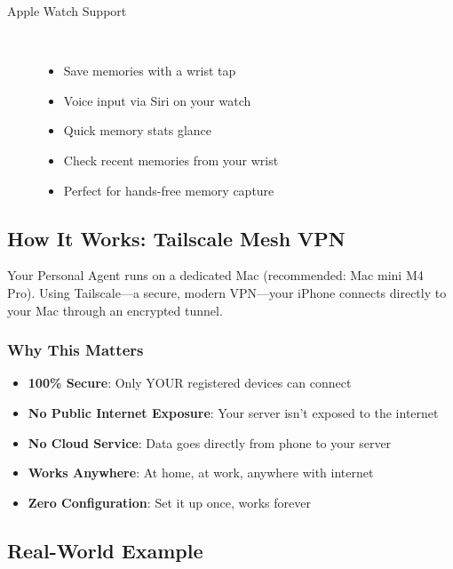\documentclass[11pt,letterpaper]{article}
\begin{document}
\begin{description}
    \item[Apple Watch Support] ~\\
        \begin{itemize}[leftmargin=*]
            \item Save memories with a wrist tap
            \item Voice input via Siri on your watch
            \item Quick memory stats glance
            \item Check recent memories from your wrist
            \item Perfect for hands-free memory capture
        \end{itemize}
\end{description}

\subsection{How It Works: Tailscale Mesh VPN}

Your Personal Agent runs on a dedicated Mac (recommended: Mac mini M4 Pro). Using Tailscale---a secure, modern VPN---your iPhone connects directly to your Mac through an encrypted tunnel.

\subsubsection{Why This Matters}
\begin{itemize}[leftmargin=*]
    \item \textcolor{secondarygreen}{\checkmark} \textbf{100\% Secure}: Only YOUR registered devices can connect
    \item \textcolor{secondarygreen}{\checkmark} \textbf{No Public Internet Exposure}: Your server isn't exposed to the internet
    \item \textcolor{secondarygreen}{\checkmark} \textbf{No Cloud Service}: Data goes directly from phone to your server
    \item \textcolor{secondarygreen}{\checkmark} \textbf{Works Anywhere}: At home, at work, anywhere with internet
    \item \textcolor{secondarygreen}{\checkmark} \textbf{Zero Configuration}: Set it up once, works forever
\end{itemize}

\subsection{Real-World Example}
\end{document}
